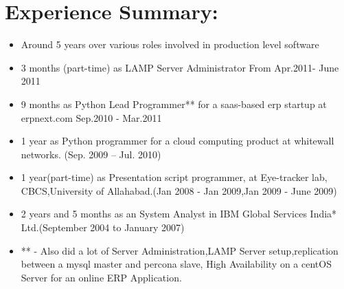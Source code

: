 \section {Experience Summary:}
	\begin{itemize}
		\item Around 5 years over various roles involved in production level software
         
		\item  3 months (part-time) as LAMP Server Administrator From Apr.2011- June 2011

		\item  9 months as Python Lead Programmer** for a saas-based erp startup at erpnext.com Sep.2010 - Mar.2011

		\item  1 year as Python programmer for a cloud computing product at whitewall networks. (Sep. 2009 – Jul. 2010)

		\item  1 year(part-time) as Presentation script programmer, at Eye-tracker lab, CBCS,University of Allahabad.(Jan 2008 - Jan 2009,Jan 2009 - June 2009)

		\item  2 years and 5 months as an System Analyst in IBM Global Services India* Ltd.(September 2004 to January 2007)

		\item ** - Also did a lot of Server Administration,LAMP Server setup,replication between a mysql master and percona slave, High Availability on a centOS Server for an online ERP Application.
	\end{itemize}